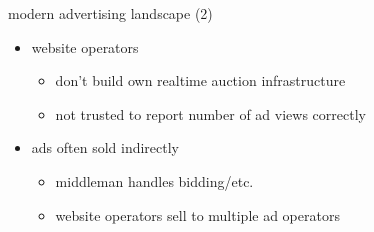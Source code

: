 \begin{frame}{modern advertising landscape (2)}
    \begin{itemize}
        \item website operators 
            \begin{itemize}
            \item don't build own realtime auction infrastructure
            \item not trusted to report number of ad views correctly
            \end{itemize}
        \item ads often sold indirectly
            \begin{itemize}
            \item middleman handles bidding/etc.
            \item website operators sell to multiple ad operators
            \end{itemize}
    \end{itemize}
\end{frame}



